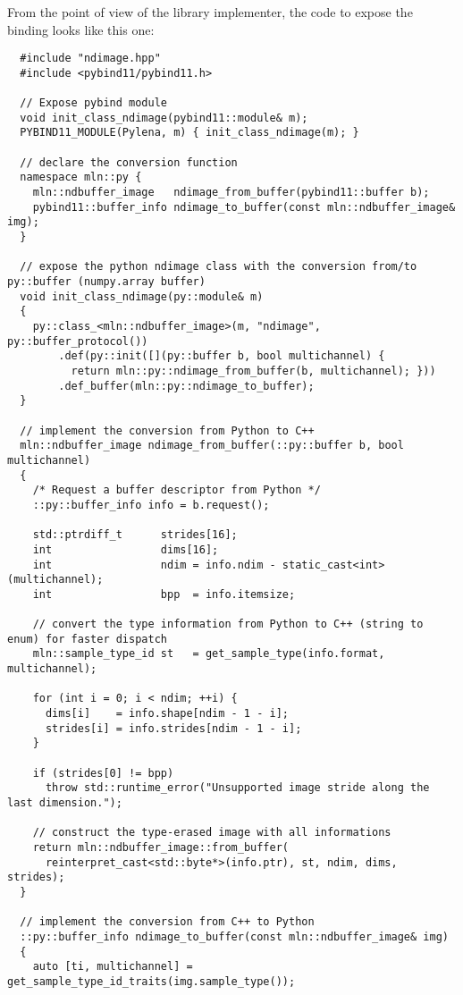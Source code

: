 From the point of view of the library implementer, the code to expose the binding looks like this one:
\begin{verbatim}
  #include "ndimage.hpp"
  #include <pybind11/pybind11.h>

  // Expose pybind module
  void init_class_ndimage(pybind11::module& m);
  PYBIND11_MODULE(Pylena, m) { init_class_ndimage(m); }

  // declare the conversion function
  namespace mln::py {
    mln::ndbuffer_image   ndimage_from_buffer(pybind11::buffer b);
    pybind11::buffer_info ndimage_to_buffer(const mln::ndbuffer_image& img);
  }

  // expose the python ndimage class with the conversion from/to py::buffer (numpy.array buffer)
  void init_class_ndimage(py::module& m)
  {
    py::class_<mln::ndbuffer_image>(m, "ndimage", py::buffer_protocol())
        .def(py::init([](py::buffer b, bool multichannel) {
          return mln::py::ndimage_from_buffer(b, multichannel); }))
        .def_buffer(mln::py::ndimage_to_buffer);
  }

  // implement the conversion from Python to C++
  mln::ndbuffer_image ndimage_from_buffer(::py::buffer b, bool multichannel)
  {
    /* Request a buffer descriptor from Python */
    ::py::buffer_info info = b.request();

    std::ptrdiff_t      strides[16];
    int                 dims[16];
    int                 ndim = info.ndim - static_cast<int>(multichannel);
    int                 bpp  = info.itemsize;

    // convert the type information from Python to C++ (string to enum) for faster dispatch
    mln::sample_type_id st   = get_sample_type(info.format, multichannel);

    for (int i = 0; i < ndim; ++i) {
      dims[i]    = info.shape[ndim - 1 - i];
      strides[i] = info.strides[ndim - 1 - i];
    }

    if (strides[0] != bpp)
      throw std::runtime_error("Unsupported image stride along the last dimension.");

    // construct the type-erased image with all informations
    return mln::ndbuffer_image::from_buffer(
      reinterpret_cast<std::byte*>(info.ptr), st, ndim, dims, strides);
  }

  // implement the conversion from C++ to Python
  ::py::buffer_info ndimage_to_buffer(const mln::ndbuffer_image& img)
  {
    auto [ti, multichannel] = get_sample_type_id_traits(img.sample_type());


\end{verbatim}
